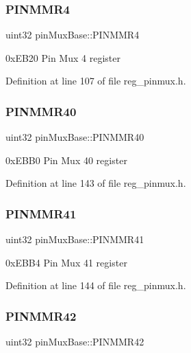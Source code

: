 \subsubsection{\texorpdfstring{P\+I\+N\+M\+M\+R4}{PINMMR4}}
{\footnotesize\ttfamily uint32 pin\+Mux\+Base\+::\+P\+I\+N\+M\+M\+R4}

0x\+E\+B20 Pin Mux 4 register 

Definition at line 107 of file reg\+\_\+pinmux.\+h.

\mbox{\label{structpinMuxBase_abe006ff9bd65ee037dd054934aa99ea5}} 
\subsubsection{\texorpdfstring{P\+I\+N\+M\+M\+R40}{PINMMR40}}
{\footnotesize\ttfamily uint32 pin\+Mux\+Base\+::\+P\+I\+N\+M\+M\+R40}

0x\+E\+B\+B0 Pin Mux 40 register 

Definition at line 143 of file reg\+\_\+pinmux.\+h.

\mbox{\label{structpinMuxBase_a29de50e3764400ea21083f9e30befa28}} 
\subsubsection{\texorpdfstring{P\+I\+N\+M\+M\+R41}{PINMMR41}}
{\footnotesize\ttfamily uint32 pin\+Mux\+Base\+::\+P\+I\+N\+M\+M\+R41}

0x\+E\+B\+B4 Pin Mux 41 register 

Definition at line 144 of file reg\+\_\+pinmux.\+h.

\mbox{\label{structpinMuxBase_ac1a333ae48738ebc37e0104dcb2db086}} 
\subsubsection{\texorpdfstring{P\+I\+N\+M\+M\+R42}{PINMMR42}}
{\footnotesize\ttfamily uint32 pin\+Mux\+Base\+::\+P\+I\+N\+M\+M\+R42}


